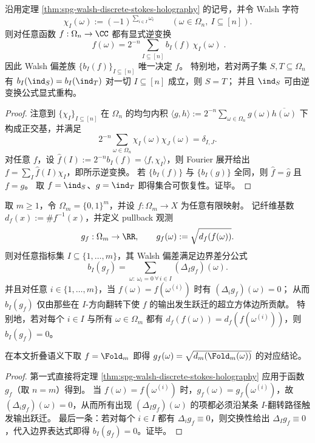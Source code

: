 \begin{corollary}\label{cor:spg-walsh-fourier-inversion-completeness}
沿用定理 \ref{thm:spg-walsh-discrete-stokes-holography} 的记号，并令 Walsh 字符
\[
\chi_I(\omega):=(-1)^{\sum_{i\in I}\omega_i}\qquad(\omega\in\Omega_n,\ I\subseteq[n]).
\]
则对任意函数 \(f:\Omega_n\to\CC\) 都有显式逆变换
\[
\boxed{\;
f(\omega)=2^{-n}\sum_{I\subseteq[n]} b_I(f)\,\chi_I(\omega)\; }.
\]
因此 Walsh 偏差族 \(\{b_I(f)\}_{I\subseteq[n]}\) 唯一决定 \(f\)。
特别地，若对两子集 \(S,T\subseteq\Omega_n\) 有
\(
b_I(\ind_S)=b_I(\ind_T)
\)
对一切 \(I\subseteq[n]\) 成立，则 \(S=T\)；
并且 \(\ind_S\) 可由逆变换公式显式重构。
\end{corollary}
\begin{proof}
注意到 \(\{\chi_I\}_{I\subseteq[n]}\) 在 \(\Omega_n\) 的均匀内积
\(
\langle g,h\rangle:=2^{-n}\sum_{\omega\in\Omega_n} g(\omega)\overline{h(\omega)}
\)
下构成正交基，并满足
\[
2^{-n}\sum_{\omega\in\Omega_n}\chi_I(\omega)\chi_J(\omega)=\delta_{I,J}.
\]
对任意 \(f\)，设 \(\widehat f(I):=2^{-n}b_I(f)=\langle f,\chi_I\rangle\)，则 Fourier 展开给出
\(
f=\sum_I \widehat f(I)\chi_I
\)，即所示逆变换。
若 \(\{b_I(f)\}\) 与 \(\{b_I(g)\}\) 全同，则 \(\widehat f=\widehat g\) 且 \(f=g\)。
取 \(f=\ind_S\)、\(g=\ind_T\) 即得集合可恢复性。证毕。
\end{proof}

\begin{corollary}\label{cor:spg-walsh-stokes-sqrt-fiber-holography}
取 \(m\ge 1\)，令 \(\Omega_m=\{0,1\}^m\)，并设 \(f:\Omega_m\to X\) 为任意有限映射。
记纤维基数 \(d_f(x):=\#f^{-1}(x)\)，并定义 pullback 观测
\[
g_f:\Omega_m\to\RR,\qquad g_f(\omega):=\sqrt{d_f(f(\omega))}.
\]
则对任意指标集 \(I\subseteq\{1,\dots,m\}\)，其 Walsh 偏差满足边界差分公式
\[
b_I(g_f)=\sum_{\omega:\ \omega_i=0\ \forall\, i\in I}(\Delta_I g_f)(\omega).
\]
并且对任意 \(i\in\{1,\dots,m\}\)，当 \(f(\omega)=f(\omega^{(i)})\) 时有 \((\Delta_i g_f)(\omega)=0\)；
从而 \(b_I(g_f)\) 仅由那些在 \(I\)-方向翻转下使 \(f\) 的输出发生跃迁的超立方体边所贡献。
特别地，若对每个 \(i\in I\) 与所有 \(\omega\in\Omega_m\) 都有 \(d_f(f(\omega))=d_f(f(\omega^{(i)}))\)，则 \(b_I(g_f)=0\)。
\par
在本文折叠语义下取 \(f=\Fold_m\) 即得 \(g_f(\omega)=\sqrt{d_m(\Fold_m(\omega))}\) 的对应结论。
\end{corollary}
\begin{proof}
第一式直接将定理 \ref{thm:spg-walsh-discrete-stokes-holography} 应用于函数 \(g_f\)（取 \(n=m\)）得到。
当 \(f(\omega)=f(\omega^{(i)})\) 时，\(g_f(\omega)=g_f(\omega^{(i)})\)，故 \((\Delta_i g_f)(\omega)=0\)，从而所有出现 \((\Delta_I g_f)(\omega)\) 的项都必须沿某条 \(I\)-翻转路径触发输出跃迁。
最后一条：若对每个 \(i\in I\) 都有 \(\Delta_i g_f\equiv 0\)，则交换性给出 \(\Delta_I g_f\equiv 0\)，代入边界表达式即得 \(b_I(g_f)=0\)。证毕。
\end{proof}

